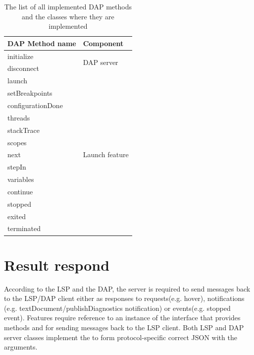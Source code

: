 \begin{table}
	\centering
	\begin{tabular}{ll}
		\toprule
		\textbf{DAP Method name} & \textbf{Component}                 \\ \midrule
		initialize               & \multirow{2}{3cm}{DAP server}      \\
		disconnect               &                                    \\ \midrule
		launch                   & \multirow{13}{3cm}{Launch feature} \\
		setBreakpoints           &                                    \\
		configurationDone        &                                    \\
		threads                  &                                    \\
		stackTrace               &                                    \\
		scopes                   &                                    \\
		next                     &                                    \\
		stepIn                   &                                    \\
		variables                &                                    \\
		continue                 &                                    \\
		stopped                  &                                    \\
		exited                   &                                    \\
		terminated               &                                    \\ \bottomrule
	\end{tabular}
	\caption{The list of all implemented DAP methods and the classes where they are implemented}
	\label{DAP_methods}
\end{table}

\section{Result respond}

According to the LSP and the DAP, the server is required to send messages back to the LSP/DAP client either as responses to requests(e.g. hover), notifications (e.g. textDocument/publishDiagnostics notification) or events(e.g. stopped event). Features require reference to an instance of the  interface that provides methods  and  for sending messages back to the LSP client. Both LSP and DAP server classes implement the  to form protocol-specific correct JSON with the arguments.

